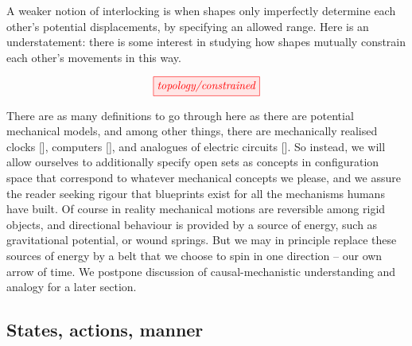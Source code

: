 
A weaker notion of interlocking is when shapes only imperfectly determine each other's potential displacements, by specifying an allowed range. Here is an understatement: there is some interest in studying how shapes mutually constrain each other's movements in this way.

\[\tikzfig{topology/constrained}\]

There are as many definitions to go through here as there are potential mechanical models, and among other things, there are mechanically realised clocks [], computers [], and analogues of electric circuits []. So instead, we will allow ourselves to additionally specify open sets as concepts in configuration space that correspond to whatever mechanical concepts we please, and we assure the reader seeking rigour that blueprints exist for all the mechanisms humans have built. Of course in reality mechanical motions are reversible among rigid objects, and directional behaviour is provided by a source of energy, such as gravitational potential, or wound springs. But we may in principle replace these sources of energy by a belt that we choose to spin in one direction -- our own arrow of time. We postpone discussion of causal-mechanistic understanding and analogy for a later section.

\subsection{States, actions, manner}\label{sec:statesactions}


